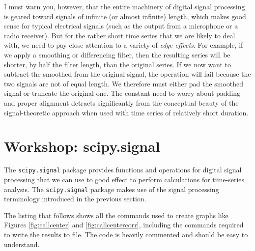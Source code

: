 I must warn you, however, that the entire machinery of digital signal
processing is geared toward signals of infinite (or almost infinite)
length, which makes good sense for typical electrical signals (such as
the output from a microphone or a radio receiver). But for the rather
short time series that we are likely to deal with, we need to pay
close attention to a variety of \emph{edge effects}.  For example, if
we apply a smoothing or differencing filter, then the resulting series
will be shorter, by half the filter length, than the original series.
If we now want to subtract the smoothed from the original signal, the
operation will fail because the two signals are not of equal length.
We therefore must either pad the smoothed signal or truncate the
original one. The constant need to worry about padding and proper
alignment detracts significantly from the conceptual beauty of the
signal-theoretic approach when used with time series of relatively
short duration. 

\section{Workshop: scipy.signal}


The \texttt{scipy.signal} package provides functions and operations
for digital signal processing that we can use to good effect to
perform calculations\vadjust{\pagebreak} for time-series analysis. The
\texttt{scipy.signal} package makes use of the signal processing
terminology introduced in the previous section.

The listing that follows shows all the commands used to create graphs
like Figures \ref{fig:callcenter} and \ref{fig:callcentercorr},
including the commands required to write the results to file. The code
is heavily commented and should be easy to understand.

